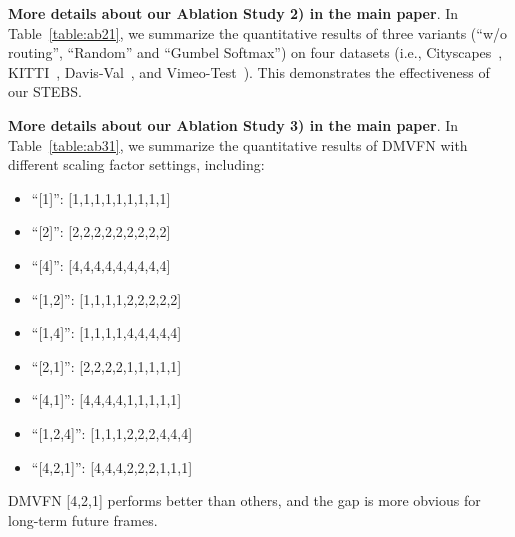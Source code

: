 \documentclass[10pt,twocolumn,letterpaper]{article}
\begin{document}
\begin{table*}[th]
\caption{\textbf{Routing Module based on STEBS is effective}. The evaluation metric is MS-SSIM ().}

\centering
{}
\label{table:ab21}
\end{table*}

\noindent
\textbf{More details about our Ablation Study 2) in the main paper}.
In Table~\ref{table:ab21}, we summarize the quantitative results of three variants (``w/o routing'', ``Random'' and ``Gumbel Softmax'') on four datasets (i.e., Cityscapes~\cite{cityscapes}, KITTI~\cite{kitti}, Davis-Val~\cite{davis}, and Vimeo-Test~\cite{vimeo}). This demonstrates the effectiveness of our STEBS.

\noindent
\textbf{More details about our Ablation Study 3) in the main paper}.
In Table~\ref{table:ab31}, we summarize the quantitative results of DMVFN with different scaling factor settings, including:
\begin{itemize}
\itemsep-0.03in
\item ``[1]'': [1,1,1,1,1,1,1,1,1]
\item ``[2]'': [2,2,2,2,2,2,2,2,2]
\item ``[4]'': [4,4,4,4,4,4,4,4,4]
\item ``[1,2]'': [1,1,1,1,2,2,2,2,2]
\item ``[1,4]'': [1,1,1,1,4,4,4,4,4]
\item ``[2,1]'': [2,2,2,2,1,1,1,1,1]
\item ``[4,1]'': [4,4,4,4,1,1,1,1,1]
\item ``[1,2,4]'': [1,1,1,2,2,2,4,4,4]
\item ``[4,2,1]'': [4,4,4,2,2,2,1,1,1]
\end{itemize}
DMVFN [4,2,1] performs better than others, and the gap is more obvious for long-term future frames. 
\end{document}
